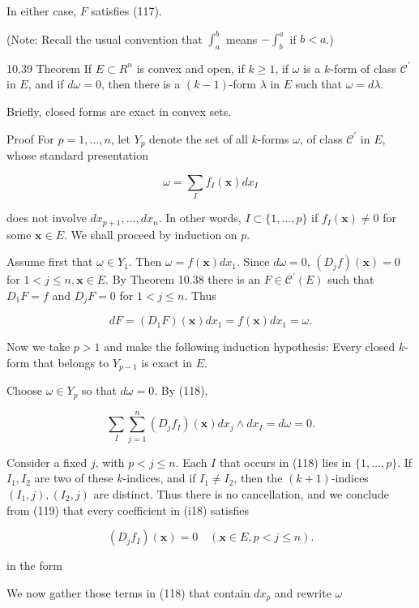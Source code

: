 \documentclass[10pt]{article}
\begin{document}
In either case, $F$ satisfies (117).

(Note: Recall the usual convention that $\int_{a}^{b}$ means $-\int_{b}^{a}$ if $b<a$.)

10.39 Theorem If $E \subset R^{n}$ is convex and open, if $k \geq 1$, if $\omega$ is a $k$-form of class $\mathscr{C}^{\prime}$ in $E$, and if $d \omega=0$, then there is a $(k-1)$-form $\lambda$ in $E$ such that $\omega=d \lambda$.

Briefly, closed forms are exact in convex sets.

Proof For $p=1, \ldots, n$, let $Y_{p}$ denote the set of all $k$-forms $\omega$, of class $\mathscr{C}^{\prime}$ in $E$, whose standard presentation

$$
\omega=\sum_{I} f_{I}(\mathbf{x}) d x_{I}
$$

does not involve $d x_{p+1}, \ldots, d x_{n}$. In other words, $I \subset\{1, \ldots, p\}$ if $f_{I}(\mathbf{x}) \neq 0$ for some $\mathbf{x} \in E$. We shall proceed by induction on $p$.

Assume first that $\omega \in Y_{1}$. Then $\omega=f(\mathbf{x}) d x_{1}$. Since $d \omega=0$, $\left(D_{j} f\right)(\mathbf{x})=0$ for $1<j \leq n, \mathbf{x} \in E$. By Theorem 10.38 there is an $F \in \mathscr{C}^{\prime}(E)$ such that $D_{1} F=f$ and $D_{j} F=0$ for $1<j \leq n$. Thus

$$
d F=\left(D_{1} F\right)(\mathbf{x}) d x_{1}=f(\mathbf{x}) d x_{1}=\omega .
$$

Now we take $p>1$ and make the following induction hypothesis: Every closed $k$-form that belongs to $Y_{p-1}$ is exact in $E$.

Choose $\omega \in Y_{p}$ so that $d \omega=0$. By (118),

$$
\sum_{I} \sum_{j=1}^{n}\left(D_{j} f_{I}\right)(\mathbf{x}) d x_{j} \wedge d x_{I}=d \omega=0 .
$$

Consider a fixed $j$, with $p<j \leq n$. Each $I$ that occurs in (118) lies in $\{1, \ldots, p\}$. If $I_{1}, I_{2}$ are two of these $k$-indices, and if $I_{1} \neq I_{2}$, then the $(k+1)$-indices $\left(I_{1}, j\right),\left(I_{2}, j\right)$ are distinct. Thus there is no cancellation, and we conclude from (119) that every coefficient in (i18) satisfies

$$
\left(D_{j} f_{I}\right)(\mathbf{x})=0 \quad(\mathbf{x} \in E, p<j \leq n) .
$$

in the form

We now gather those terms in (118) that contain $d x_{p}$ and rewrite $\omega$
\end{document}
